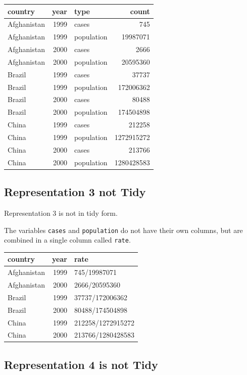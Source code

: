 \documentclass[]{book}
\begin{document}
\begin{tabular}{l|r|l|r}
\hline
country & year & type & count\\
\hline
Afghanistan & 1999 & cases & 745\\
\hline
Afghanistan & 1999 & population & 19987071\\
\hline
Afghanistan & 2000 & cases & 2666\\
\hline
Afghanistan & 2000 & population & 20595360\\
\hline
Brazil & 1999 & cases & 37737\\
\hline
Brazil & 1999 & population & 172006362\\
\hline
Brazil & 2000 & cases & 80488\\
\hline
Brazil & 2000 & population & 174504898\\
\hline
China & 1999 & cases & 212258\\
\hline
China & 1999 & population & 1272915272\\
\hline
China & 2000 & cases & 213766\\
\hline
China & 2000 & population & 1280428583\\
\hline
\end{tabular}

\subsection{Representation 3 not Tidy}\label{representation-3-not-tidy}

Representation 3 is not in tidy form.

The variables \texttt{cases} and \texttt{population} do not have their
own columns, but are combined in a single column called \texttt{rate}.

\begin{tabular}{l|r|l}
\hline
country & year & rate\\
\hline
Afghanistan & 1999 & 745/19987071\\
\hline
Afghanistan & 2000 & 2666/20595360\\
\hline
Brazil & 1999 & 37737/172006362\\
\hline
Brazil & 2000 & 80488/174504898\\
\hline
China & 1999 & 212258/1272915272\\
\hline
China & 2000 & 213766/1280428583\\
\hline
\end{tabular}

\subsection{Representation 4 is not
Tidy}\label{representation-4-is-not-tidy}
\end{document}
